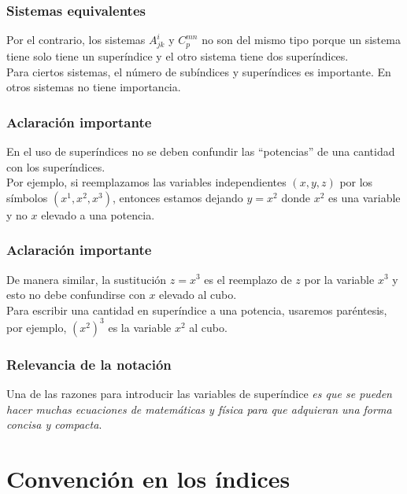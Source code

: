 \documentclass[12pt]{beamer}
\begin{document}
\begin{frame}
\frametitle{Sistemas equivalentes}
Por el contrario, los sistemas $A_{jk}^{i}$ y $C_{p}^{mn}$ no son del mismo tipo porque un sistema tiene solo tiene un superíndice y el otro sistema tiene dos superíndices.
\\
\bigskip
\pause
Para ciertos sistemas, el número de subíndices y superíndices es importante. En otros sistemas no tiene importancia.
\end{frame}
\begin{frame}
\frametitle{Aclaración importante}
En el uso de superíndices no se deben confundir las \enquote{potencias} de una cantidad con los superíndices.
\\
\bigskip
\pause
Por ejemplo, si reemplazamos las variables independientes $(x, y, z)$ por los símbolos $(x^{1}, x^{2}, x^{3})$, entonces estamos dejando $y = x^{2}$ donde $x^{2}$ es una variable y no $x$ elevado a una potencia.
\end{frame}
\begin{frame}
\frametitle{Aclaración importante}
De manera similar, la sustitución $z = x^{3}$ es el reemplazo de $z$ por la variable $x^{3}$ y esto no debe confundirse con $x$ elevado al cubo. 
\\
\bigskip
\pause
Para escribir una cantidad en superíndice a una potencia, usaremos paréntesis, por ejemplo, $(x^{2})^{3}$ es la variable $x^{2}$ al cubo.
\end{frame}
\begin{frame}
\frametitle{Relevancia de la notación}
Una de las razones para introducir las variables de superíndice \emph{es que se pueden hacer muchas ecuaciones de matemáticas y física para que adquieran una forma concisa y compacta}.
\end{frame}
\section{Convención en los índices}
\end{document}
